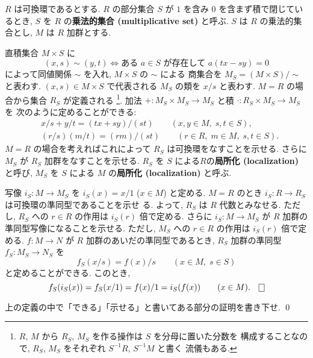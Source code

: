 \documentclass[12pt,twoside]{jarticle}
\begin{document}
\begin{definition}[可換環および加群の局所化]
  $R$ は可換環であるとする.
  $R$ の部分集合 $S$ が $1$ を含み $0$ を含まず積で閉じているとき, 
  $S$ を $R$ の{\bf 乗法的集合 (multiplicative set)} と呼ぶ.
  $S$ は $R$ の乗法的集合とし, $M$ は $R$ 加群とする.

  直積集合 $M\times S$ に
  \begin{equation*}
    (x,s)\sim (y,t)
    \iff \text{ある $a\in S$ が存在して $a(t x - s y) = 0$}
  \end{equation*}
  によって同値関係 $\sim$ を入れ, $M\times S$ の $\sim$ による
  商集合を $M_S = (M\times S)/{\sim}$ と表わす. 
  $(x,s)\in M\times S$ で代表される $M_S$ の類を $x/s$ と表わす.
  $M = R$ の場合から集合 $R_S$ が定義される%
  \footnote{$R$, $M$ から $R_S$, $M_S$ を作る操作は $S$ を分母に置いた分数を
    構成することなので, $R_S$, $M_S$ をそれぞれ $S^{-1}R$, $S^{-1}M$ と書く
    流儀もある.}.
  加法 $+:M_S\times M_S\to M_S$ と積 $\cdot:R_S\times M_S\to M_S$ を
  次のように定めることができる:
  \begin{align*}
    &
    x/s + y/t = (t x + s y)/(st)  \qquad (x,y\in M,\;s,t\in S),
    \\ &
    (r/s)(m/t) = (rm)/(st)  \qquad (r\in R,\; m\in M,\; s,t\in S).
  \end{align*}
  $M = R$ の場合を考えればこれによって $R_S$ は可換環をなすことを示せる. 
  さらに $M_S$ が $R_S$ 加群をなすことを示せる.  
  $R_S$ を $S$ による$R$の{\bf 局所化 (localization)} と呼び, $M_S$ を $S$
  による $M$ の{\bf 局所化 (localization)} と呼ぶ.

  写像 $i_S: M\to M_S$ を $i_S(x) = x/1$ ($x\in M$) と定める. 
  $M = R$ のとき $i_S: R\to R_S$ は可換環の準同型であることを示せ
  る.  よって, $R_S$ は $R$ 代数とみなせる.
  ただし, $R_S$ への $r\in R$ の作用は $i_S(r)$ 倍で定める.
  さらに $i_S:M\to M_S$ が $R$ 加群の準同型写像になることを示せる.
  ただし, $M_S$ への $r\in R$ の作用は $i_S(r)$ 倍で定める.
  $f:M\to N$ が $R$ 加群のあいだの準同型であるとき,
  $R_S$ 加群の準同型 $f_S:M_S\to N_S$ を%
  \begin{equation*}
    f_S(x/s) = f(x)/s   \qquad (x\in M,\; s\in S)
  \end{equation*}
  と定めることができる.  このとき,
  \begin{equation*}
    f_S(i_S(x)) = f_S(x/1) = f(x)/1 = i_S(f(x))
    \qquad (x\in M).
    \qed
  \end{equation*}
\end{definition}

\begin{question}
  上の定義の中で「できる」「示せる」と書いてある部分の証明を書き下せ. \qed
\end{question}
\end{document}
